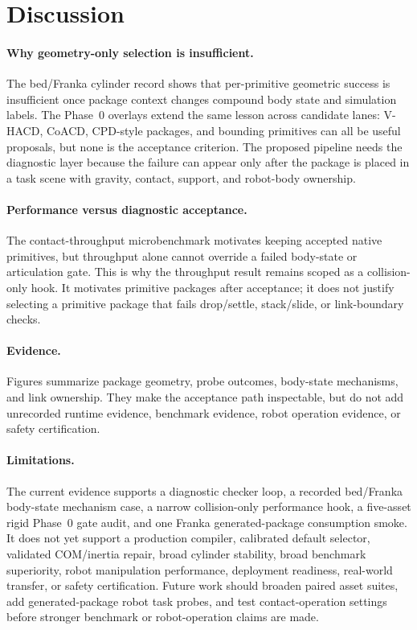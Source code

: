 \section{Discussion}
\label{sec:discussion}

\paragraph{Why geometry-only selection is insufficient.}
The bed/Franka cylinder record shows that per-primitive geometric success is insufficient once package context changes compound body state and simulation labels.
The Phase~0 overlays extend the same lesson across candidate lanes: V-HACD, CoACD, CPD-style packages, and bounding primitives can all be useful proposals, but none is the acceptance criterion.
The proposed pipeline needs the diagnostic layer because the failure can appear only after the package is placed in a task scene with gravity, contact, support, and robot-body ownership.

\paragraph{Performance versus diagnostic acceptance.}
The contact-throughput microbenchmark motivates keeping accepted native primitives, but throughput alone cannot override a failed body-state or articulation gate.
This is why the throughput result remains scoped as a collision-only hook.
It motivates primitive packages after acceptance; it does not justify selecting a primitive package
that fails drop/settle, stack/slide, or link-boundary checks.

\paragraph{Evidence.}
Figures summarize package geometry, probe outcomes, body-state mechanisms, and link ownership.
They make the acceptance path inspectable, but do not add unrecorded runtime evidence, benchmark
evidence, robot operation evidence, or safety certification.

\paragraph{Limitations.}
The current evidence supports a diagnostic checker loop, a recorded bed/Franka body-state mechanism case, a narrow collision-only performance hook, a five-asset rigid Phase~0 gate audit, and one Franka generated-package consumption smoke.
It does not yet support a production compiler, calibrated default selector, validated COM/inertia repair, broad cylinder stability, broad benchmark superiority, robot manipulation performance, deployment readiness, real-world transfer, or safety certification.
Future work should broaden paired asset suites, add generated-package robot task probes, and test contact-operation settings before stronger benchmark or robot-operation claims are made.
